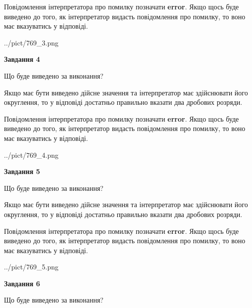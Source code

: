 \documentclass[12pt, ukrainian]{article}
\begin{document}
{\begin {Large}
Повідомлення інтерпретатора про помилку позначати \textbf{error}.
Якщо щось буде виведено до того, як інтерпретатор видасть повідомлення про помилку, 
то воно має вказуватись у відповіді. \par

\begin{center}
	{../pict/769_3.png}
\end{center}
\newpage

{\begin {center}\textbf{Завдання 4}\end {center}}\par
Що буде виведено за виконання? \par

Якщо має бути виведено дійсне значення та інтерпретатор має здійснювати його округлення, 
то у відповіді достатньо правильно вказати два дробових розряди.

Повідомлення інтерпретатора про помилку позначати \textbf{error}.
Якщо щось буде виведено до того, як інтерпретатор видасть повідомлення про помилку, 
то воно має вказуватись у відповіді. \par

\begin{center}
	{../pict/769_4.png}
\end{center}
\newpage

{\begin {center}\textbf{Завдання 5}\end {center}}\par
Що буде виведено за виконання? \par

Якщо має бути виведено дійсне значення та інтерпретатор має здійснювати його округлення, 
то у відповіді достатньо правильно вказати два дробових розряди.

Повідомлення інтерпретатора про помилку позначати \textbf{error}.
Якщо щось буде виведено до того, як інтерпретатор видасть повідомлення про помилку, 
то воно має вказуватись у відповіді. \par

\begin{center}
	{../pict/769_5.png}
\end{center}
\newpage

{\begin {center}\textbf{Завдання 6}\end {center}}\par
Що буде виведено за виконання? \par


\end{Large}}
\end{document}
